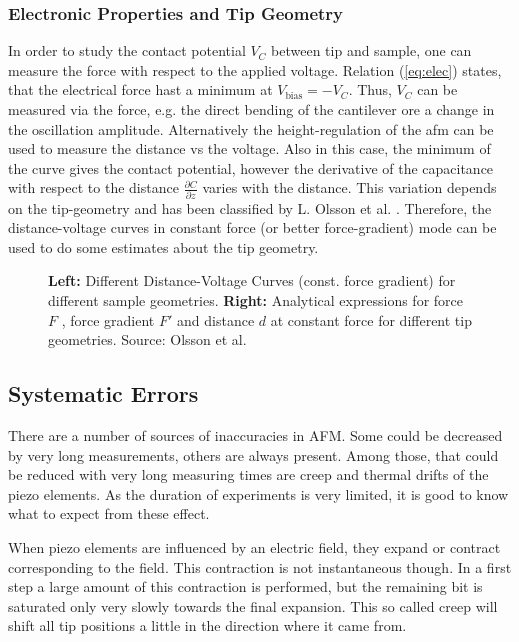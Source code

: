 \documentclass[a4paper]{scrartcl}
\numberwithin{equation}{section}
\numberwithin{figure}{section}
\numberwithin{table}{section}
\newcommand{\Formel}[1]{(\ref{#1})}
\begin{document}
\subsubsection*{Electronic Properties and Tip Geometry}
In order to study the contact potential $V_C$ between tip and sample, one can measure the force with respect to the applied voltage. Relation \Formel{eq:elec} states, that the electrical force hast a minimum at $V_\text{bias} = -V_C$. Thus, $V_C$ can be measured via the force, e.g. the direct bending of the cantilever ore a change in the oscillation amplitude. Alternatively the height-regulation of the afm can be used to measure the distance vs the voltage. Also in this case, the minimum of the curve gives the contact potential, however the derivative of the capacitance with respect to the distance $\frac{\partial C}{\partial z}$ varies with the distance. This variation depends on the tip-geometry and has been classified by L. Olsson et al. \cite{olsson}. Therefore, the distance-voltage curves in constant force (or better force-gradient) mode can be used to do some estimates about the tip geometry.

\begin{figure} 
 \centering
\caption{
\small \textbf{Left:} Different Distance-Voltage Curves (const. force gradient) for different sample geometries. \textbf{Right:} Analytical expressions for force $F$ , force gradient $F'$ and distance $d$ at constant force for different tip geometries. Source: Olsson et al. \cite{olsson} } 
	\label{fig:geometry}
\end{figure}


\subsection{Systematic Errors}
There are a number of sources of inaccuracies in AFM. Some could be decreased by very long measurements, others are always present. Among those, that could be reduced with very long measuring times are creep and thermal drifts of the piezo elements. As the duration of experiments is very limited, it is good to know what to expect from these effect.

When piezo elements are influenced by an electric field, they expand or contract corresponding to the field. This contraction is not instantaneous though. In a first step a large amount of this contraction is performed, but the remaining bit is saturated only very slowly towards the final expansion. This so called creep will shift all tip positions a little in the direction where it came from.
\end{document}
